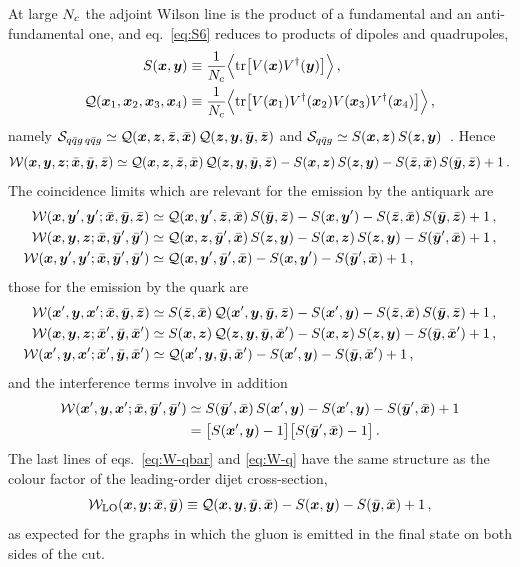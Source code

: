 At large $\Nc$ the adjoint Wilson line is the product of a fundamental and an anti-fundamental one,
and eq.~\eqref{eq:S6} reduces to products of dipoles and quadrupoles,
\begin{align}
S(\x,\y)&\equiv\frac{1}{\Nc}\Big\langle\tr\big[V(\x)V^\dagger(\y)\big]\Big\rangle\,,
\nonumber\\
\cQ(\x_1,\x_2,\x_3,\x_4)&\equiv\frac{1}{\Nc}\Big\langle\tr\big[V(\x_1)V^\dagger(\x_2)V(\x_3)V^\dagger(\x_4)\big]\Big\rangle\,,
\end{align}
namely $\cS_{\qqg\,\qqg}\simeq\cQ(\x,\z,\bz,\bx)\,\cQ(\z,\y,\by,\bz)$ and
$\cS_{\qqg}\simeq S(\x,\z)\,S(\z,\y)$~\cite{Iancu:2022gpw}. Hence
\begin{equation}
\cW(\x,\y,\z;\bx,\by,\bz)\simeq\cQ(\x,\z,\bz,\bx)\,\cQ(\z,\y,\by,\bz)-S(\x,\z)\,S(\z,\y)
-S(\bz,\bx)\,S(\by,\bz)+1\,.
\label{eq:W-largeN}
\end{equation}
The coincidence limits which are relevant for the emission by the antiquark are
\begin{align}
\cW(\x,\yp,\yp;\bx,\by,\bz)&\simeq\cQ(\x,\yp,\bz,\bx)\,S(\by,\bz)-S(\x,\yp)-S(\bz,\bx)\,S(\by,\bz)+1\,,
\nonumber\\
\cW(\x,\y,\z;\bx,\byp,\byp)&\simeq\cQ(\x,\z,\byp,\bx)\,S(\z,\y)-S(\x,\z)\,S(\z,\y)-S(\byp,\bx)+1\,,
\nonumber\\
\cW(\x,\yp,\yp;\bx,\byp,\byp)&\simeq\cQ(\x,\yp,\byp,\bx)-S(\x,\yp)-S(\byp,\bx)+1\,,
\label{eq:W-qbar}
\end{align}
those for the emission by the quark are
\begin{align}
\cW(\xp,\y,\xp;\bx,\by,\bz)&\simeq S(\bz,\bx)\,\cQ(\xp,\y,\by,\bz)-S(\xp,\y)-S(\bz,\bx)\,S(\by,\bz)+1\,,
\nonumber\\
\cW(\x,\y,\z;\bxp,\by,\bxp)&\simeq S(\x,\z)\,\cQ(\z,\y,\by,\bxp)-S(\x,\z)\,S(\z,\y)-S(\by,\bxp)+1\,,
\nonumber\\
\cW(\xp,\y,\xp;\bxp,\by,\bxp)&\simeq\cQ(\xp,\y,\by,\bxp)-S(\xp,\y)-S(\by,\bxp)+1\,,
\label{eq:W-q}
\end{align}
and the interference terms involve in addition
\begin{align}
\cW(\xp,\y,\xp;\bx,\byp,\byp)&\simeq S(\byp,\bx)\,S(\xp,\y)-S(\xp,\y)-S(\byp,\bx)+1
\nonumber\\
&=\big[S(\xp,\y)-1\big]\big[S(\byp,\bx)-1\big]\,.
\label{eq:W-int}
\end{align}
The last lines of eqs.~\eqref{eq:W-qbar} and \eqref{eq:W-q} have the same structure as the colour
factor of the leading-order dijet cross-section,
\begin{equation}
\cW_{\rm LO}(\x,\y;\bx,\by)\equiv\cQ(\x,\y,\by,\bx)-S(\x,\y)-S(\by,\bx)+1\,,
\label{eq:WLO}
\end{equation}
as expected for the graphs in which the gluon is emitted in the final state on both sides of the cut.

